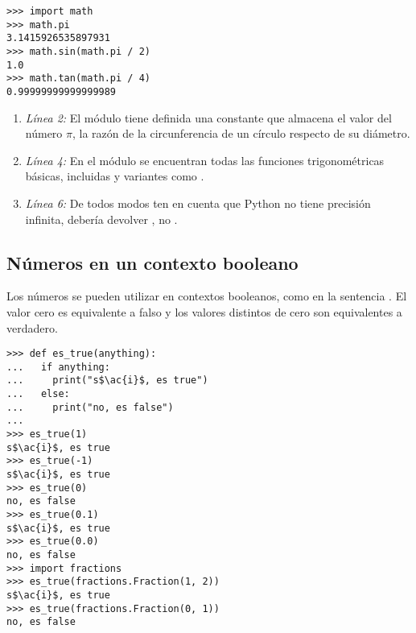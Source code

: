 \noindent\begin{minipage}{\textwidth}
\begin{lstlisting}[mathescape=True]
>>> import math
>>> math.pi
3.1415926535897931
>>> math.sin(math.pi / 2)
1.0
>>> math.tan(math.pi / 4)
0.99999999999999989
\end{lstlisting}
\end{minipage}

\begin{enumerate}

\item \emph{Línea 2:} El módulo  tiene definida una constante que almacena el valor del número $\pi$, la razón de la circunferencia de un círculo respecto de su diámetro.

\item \emph{Línea 4:} En el módulo  se encuentran todas las funciones trigonométricas básicas, incluidas  y variantes como .

\item \emph{Línea 6:} De todos modos ten en cuenta que Python no tiene precisión infinita,  debería devolver , no .

\end{enumerate}

\subsection{Números en un contexto booleano}


Los números se pueden utilizar en contextos booleanos, como en la sentencia . El valor cero es equivalente a falso y los valores distintos de cero son equivalentes a verdadero.

\noindent\begin{minipage}{\textwidth}
\begin{lstlisting}[mathescape=True]
>>> def es_true(anything):
...   if anything:
...     print("s$\ac{i}$, es true")
...   else:
...     print("no, es false")
...
>>> es_true(1)
s$\ac{i}$, es true
>>> es_true(-1)
s$\ac{i}$, es true
>>> es_true(0)
no, es false
>>> es_true(0.1)
s$\ac{i}$, es true
>>> es_true(0.0)
no, es false
>>> import fractions
>>> es_true(fractions.Fraction(1, 2))
s$\ac{i}$, es true
>>> es_true(fractions.Fraction(0, 1))
no, es false
\end{lstlisting}
\end{minipage}

